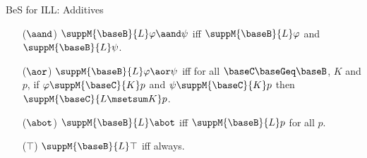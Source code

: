 \documentclass{beamer}
\begin{document}
\begin{frame}{BeS for ILL: Additives}
	\begin{itemize}
	\item[($\aand$)] $\suppM{\baseB}{L}\varphi\aand\psi$ iff $\suppM{\baseB}{L}\varphi$ and $\suppM{\baseB}{L}\psi$.\vspace{0.3cm}
	\item[($\aor$)] $\suppM{\baseB}{L}\varphi\aor\psi$ iff for all $\baseC\baseGeq\baseB$, $K$ and $p$, if $\varphi\suppM{\baseC}{K}p$ and $\psi\suppM{\baseC}{K}p$ then $\suppM{\baseC}{L\msetsum K}p$.\vspace{0.3cm}
	\item[($\abot$)] $\suppM{\baseB}{L}\abot$ iff $\suppM{\baseB}{L}p$ for all $p$.\vspace{0.3cm}
	\item[($\top$)] $\suppM{\baseB}{L}\top$ iff always.\vspace{0.3cm}
	\end{itemize}
\end{frame}
\end{document}
